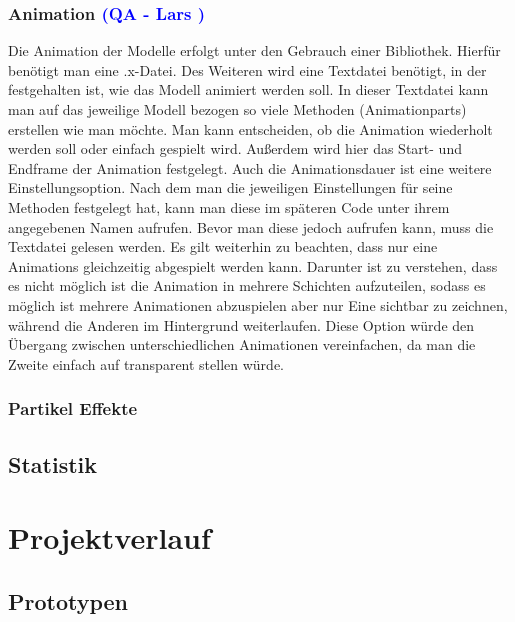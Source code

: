 \documentclass{article}
\begin{document}
\vspace{1cm}
\subsubsection{Animation \textcolor{blue}{(QA - Lars )}}
Die Animation der Modelle erfolgt unter den Gebrauch einer Bibliothek. Hierfür benötigt man eine .x-Datei.
Des Weiteren wird eine Textdatei benötigt, in der festgehalten ist, wie das Modell animiert werden soll.
In dieser Textdatei kann man auf das jeweilige Modell bezogen so viele Methoden (Animationparts) erstellen
wie man möchte. Man kann entscheiden, ob die Animation wiederholt werden soll oder einfach gespielt wird.
Außerdem wird hier das Start- und Endframe der Animation festgelegt. Auch die Animationsdauer ist eine weitere
Einstellungsoption. Nach dem man die jeweiligen Einstellungen für seine Methoden festgelegt hat, kann man diese
im späteren Code unter ihrem angegebenen Namen aufrufen. Bevor man diese jedoch aufrufen kann, muss die
Textdatei gelesen werden. Es gilt weiterhin zu beachten, dass nur eine Animations gleichzeitig abgespielt werden kann.
Darunter ist zu verstehen, dass es nicht möglich ist die Animation in mehrere Schichten aufzuteilen, sodass es möglich ist
mehrere Animationen abzuspielen aber nur Eine sichtbar zu zeichnen, während die Anderen im Hintergrund weiterlaufen.
Diese Option würde den Übergang zwischen unterschiedlichen Animationen vereinfachen, da man die Zweite einfach auf
transparent stellen würde.

\vspace{1cm}
\subsubsection{Partikel Effekte}

\vspace{2cm}
\subsection{Statistik}


\newpage
\section{Projektverlauf}

\vspace{2cm}
\subsection{Prototypen}
\end{document}
